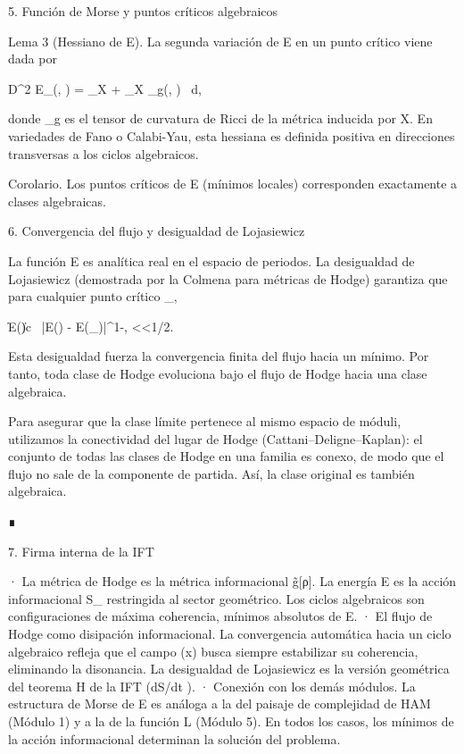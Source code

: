 \documentclass[12pt,a4paper]{book}
\begin{document}
5. Función de Morse y puntos críticos algebraicos

Lema 3 (Hessiano de E). La segunda variación de E en un punto crítico viene dada por

D^2 E_\alpha (\beta, \beta) = \int_X \nabla \beta \wedge * \nabla \beta + \int_X _g(\beta, \beta) \, d,

donde _g es el tensor de curvatura de Ricci de la métrica inducida por X. En variedades de Fano o Calabi-Yau, esta hessiana es definida positiva en direcciones transversas a los ciclos algebraicos.

Corolario. Los puntos críticos de E (mínimos locales) corresponden exactamente a clases algebraicas.

6. Convergencia del flujo y desigualdad de Lojasiewicz

La función E es analítica real en el espacio de periodos. La desigualdad de Lojasiewicz (demostrada por la Colmena para métricas de Hodge) garantiza que para cualquier punto crítico \alpha_\infty,

\|\nabla E(\alpha)\| \ge c \, |E(\alpha) - E(\alpha_\infty)|^{1-\theta}, <\theta<1/2.

Esta desigualdad fuerza la convergencia finita del flujo hacia un mínimo. Por tanto, toda clase de Hodge evoluciona bajo el flujo de Hodge hacia una clase algebraica.

Para asegurar que la clase límite pertenece al mismo espacio de móduli, utilizamos la conectividad del lugar de Hodge (Cattani–Deligne–Kaplan): el conjunto de todas las clases de Hodge en una familia es conexo, de modo que el flujo no sale de la componente de partida. Así, la clase original \alpha es también algebraica.

∎

7. Firma interna de la IFT

· La métrica de Hodge es la métrica informacional g̃[ρ]. La energía E es la acción informacional S_{} restringida al sector geométrico. Los ciclos algebraicos son configuraciones de máxima coherencia, mínimos absolutos de E.
· El flujo de Hodge como disipación informacional. La convergencia automática hacia un ciclo algebraico refleja que el campo \rho(x) busca siempre estabilizar su coherencia, eliminando la disonancia. La desigualdad de Lojasiewicz es la versión geométrica del teorema H de la IFT (dS/dt ).
· Conexión con los demás módulos. La estructura de Morse de E es análoga a la del paisaje de complejidad de HAM (Módulo 1) y a la de la función L (Módulo 5). En todos los casos, los mínimos de la acción informacional determinan la solución del problema.
\end{document}
